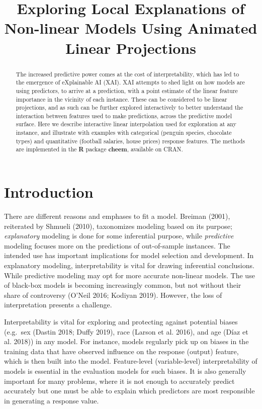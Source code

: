 \documentclass[
]{article}
\title{Exploring Local Explanations of Non-linear Models Using Animated Linear Projections}
\author{}
\date{\vspace{-2.5em}}
\begin{document}
\maketitle
\begin{abstract}
The increased predictive power comes at the cost of interpretability, which has led to the emergence of eXplainable AI (XAI). XAI attempts to shed light on how models are using predictors, to arrive at a prediction, with a point estimate of the linear feature importance in the vicinity of each instance. These can be considered to be linear projections, and as such can be further explored interactively to better understand the interaction between features used to make predictions, across the predictive model surface. Here we describe interactive linear interpolation used for exploration at any instance, and illustrate with examples with categorical (penguin species, chocolate types) and quantitative (football salaries, house prices) response features. The methods are implemented in the \textbf{R} package \textbf{cheem}, available on CRAN.
\end{abstract}

\hypertarget{sec:intro}{%
\section{Introduction}\label{sec:intro}}

There are different reasons and emphases to fit a model. Breiman (2001), reiterated by Shmueli (2010), taxonomizes modeling based on its purpose; \emph{explanatory} modeling is done for some inferential purpose, while \emph{predictive} modeling focuses more on the predictions of out-of-sample instances. The intended use has important implications for model selection and development. In explanatory modeling, interpretability is vital for drawing inferential conclusions. While predictive modeling may opt for more accurate non-linear models. The use of black-box models is becoming increasingly common, but not without their share of controversy (O'Neil 2016; Kodiyan 2019). However, the loss of interpretation presents a challenge.

Interpretability is vital for exploring and protecting against potential biases (e.g.~sex (Dastin 2018; Duffy 2019), race (Larson et al. 2016), and age (Díaz et al. 2018)) in any model. For instance, models regularly pick up on biases in the training data that have observed influence on the response (output) feature, which is then built into the model. Feature-level (variable-level) interpretability of models is essential in the evaluation models for such biases. It is also generally important for many problems, where it is not enough to accurately predict accurately but one must be able to explain which predictors are most responsible in generating a response value.
\end{document}
